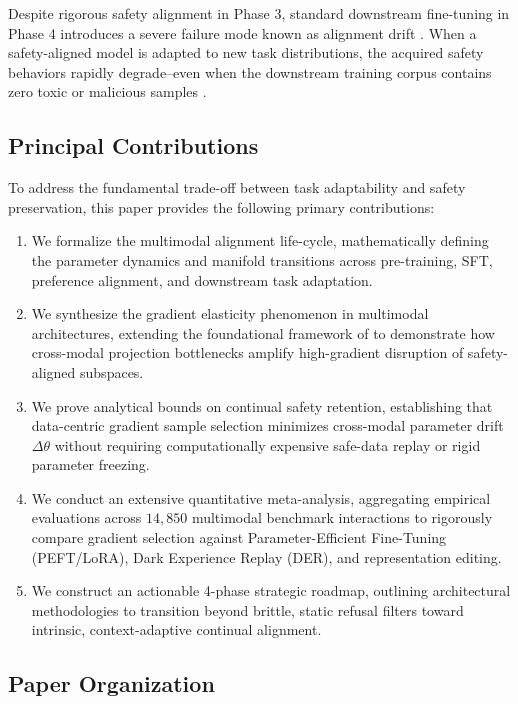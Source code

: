 \documentclass[10pt,journal,compsoc,twocolumn]{IEEEtran}
\begin{document}
Despite rigorous safety alignment in Phase 3, standard downstream fine-tuning in Phase 4 introduces a severe failure mode known as alignment drift \cite{arxiv_2604_17215}. When a safety-aligned model is adapted to new task distributions, the acquired safety behaviors rapidly degrade--even when the downstream training corpus contains zero toxic or malicious samples \cite{arxiv_2501_02497}.


\subsection{Principal Contributions}

To address the fundamental trade-off between task adaptability and safety preservation, this paper provides the following primary contributions:
\begin{enumerate}
  \item We formalize the multimodal alignment life-cycle, mathematically defining the parameter dynamics and manifold transitions across pre-training, SFT, preference alignment, and downstream task adaptation.
  \item We synthesize the gradient elasticity phenomenon in multimodal architectures, extending the foundational framework of \cite{arxiv_2604_17215} to demonstrate how cross-modal projection bottlenecks amplify high-gradient disruption of safety-aligned subspaces.
  \item We prove analytical bounds on continual safety retention, establishing that data-centric gradient sample selection minimizes cross-modal parameter drift $\Delta \theta$ without requiring computationally expensive safe-data replay or rigid parameter freezing.
  \item We conduct an extensive quantitative meta-analysis, aggregating empirical evaluations across $14,850$ multimodal benchmark interactions to rigorously compare gradient selection against Parameter-Efficient Fine-Tuning (PEFT/LoRA), Dark Experience Replay (DER), and representation editing.
  \item We construct an actionable 4-phase strategic roadmap, outlining architectural methodologies to transition beyond brittle, static refusal filters toward intrinsic, context-adaptive continual alignment.
\end{enumerate}


\subsection{Paper Organization}
\end{document}
